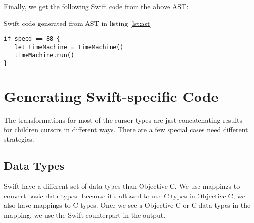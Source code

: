 \documentclass{sfuthesis}
\begin{document}
Finally, we get the following Swift code from the above AST:

\begin{listing}[H]
\caption{Swift code generated from AST in listing \ref{lst:ast}}
\begin{verbatim}
if speed == 88 {
   let timeMachine = TimeMachine()
   timeMachine.run()
}
\end{verbatim}
\end{listing}

\section{Generating Swift-specific Code}

The transformations for most of the cursor types are just concatenating results for children cursors in different ways. There are a few special cases need different strategies.

\subsection{Data Types}

Swift have a different set of data types than Objective-C. We use mappings to convert basic data types. Because it's allowed to use C types in Objective-C, we also have mappings to C types. Once we see a Objective-C or C data types in the mapping, we use the Swift counterpart in the output.

\newcommand{\specialcell}[2][c]{%
  \begin{tabular}[#1]{@{}c@{}}#2\end{tabular}}
\end{document}
